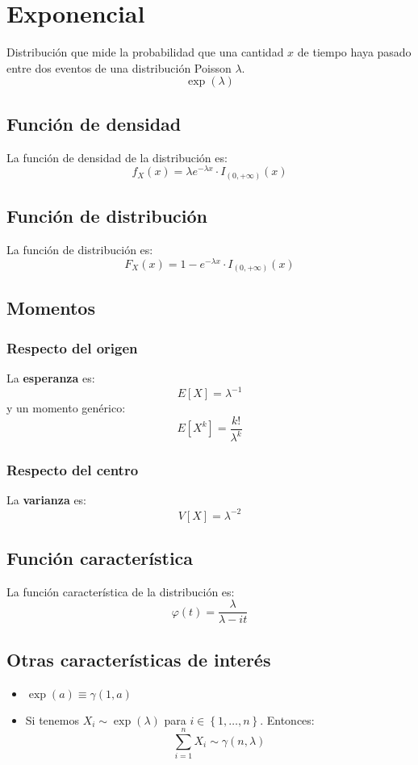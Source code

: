 \section{Exponencial}
\label{sec:exponencial}
Distribución que mide la probabilidad que una cantidad $x$ de tiempo haya pasado entre 
dos eventos de una distribución Poisson $\lambda$.
\[
\boxed{\exp\left( \lambda \right)}
\]

\subsection{Función de densidad}
La función de densidad de la distribución es:
\[
f_X \left( x \right) = \lambda e^{-\lambda x} \cdot I_{\left( 0, +\infty \right)}\left( x \right)
\]

\subsection{Función de distribución}
La función de distribución es:
\[
F_X\left( x \right) = 1 - e^{-\lambda x} \cdot I_{\left( 0, +\infty \right)}\left( x \right)
\]

\subsection{Momentos}

\subsubsection*{Respecto del origen}
La \textbf{esperanza} es: 
\[
    E\left[ X \right] = \lambda^{-1}
\]
y un momento genérico: 
\[
    E\left[ X^k \right] = \frac{k!}{\lambda^k}
\]
\subsubsection*{Respecto del centro}
La \textbf{varianza} es:
\[
    V\left[ X \right] = \lambda^{-2}
\]

\subsection{Función característica}
La función característica de la distribución es:
\[
\varphi\left( t \right) = \frac{\lambda}{\lambda - it}
\]

\subsection{Otras características de interés}
\begin{itemize}
    \item $\exp\left( a \right) \equiv \gamma\left( 1, a \right)$
    \item Si tenemos $X_i \sim \exp\left( \lambda \right)$ para $i \in \left\{ 1, \ldots, n \right\}$. Entonces:
    \[
    \sum_{i=1}^{n} X_i \sim \gamma \left( n, \lambda \right) 
    \]
\end{itemize}
